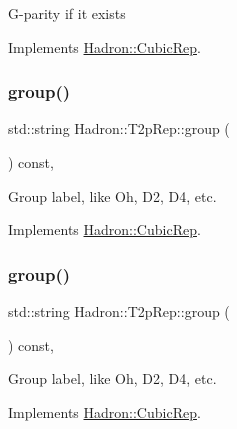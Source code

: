 G-\/parity if it exists 

Implements \mbox{\hyperlink{structHadron_1_1CubicRep_a52104e43266d1614c00bbd1c3b395458}{Hadron\+::\+Cubic\+Rep}}.

\mbox{\label{structHadron_1_1T2pRep_a880ce85ebd0b9fe1feddf9addc9a6cc3}} 
\subsubsection{\texorpdfstring{group()}{group()}\hspace{0.1cm}{\footnotesize\ttfamily [1/3]}}
{\footnotesize\ttfamily std\+::string Hadron\+::\+T2p\+Rep\+::group (\begin{DoxyParamCaption}{ }\end{DoxyParamCaption}) const\hspace{0.3cm}{\ttfamily [inline]}, {\ttfamily [virtual]}}

Group label, like Oh, D2, D4, etc. 

Implements \mbox{\hyperlink{structHadron_1_1CubicRep_a0748f11ec87f387062c8e8981339a29c}{Hadron\+::\+Cubic\+Rep}}.

\mbox{\label{structHadron_1_1T2pRep_a880ce85ebd0b9fe1feddf9addc9a6cc3}} 
\subsubsection{\texorpdfstring{group()}{group()}\hspace{0.1cm}{\footnotesize\ttfamily [2/3]}}
{\footnotesize\ttfamily std\+::string Hadron\+::\+T2p\+Rep\+::group (\begin{DoxyParamCaption}{ }\end{DoxyParamCaption}) const\hspace{0.3cm}{\ttfamily [inline]}, {\ttfamily [virtual]}}

Group label, like Oh, D2, D4, etc. 

Implements \mbox{\hyperlink{structHadron_1_1CubicRep_a0748f11ec87f387062c8e8981339a29c}{Hadron\+::\+Cubic\+Rep}}.

\mbox{\label{structHadron_1_1T2pRep_a880ce85ebd0b9fe1feddf9addc9a6cc3}} 
